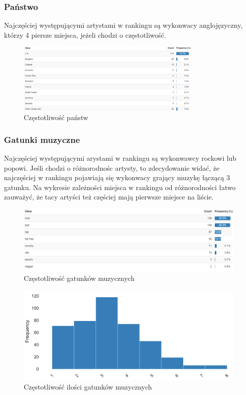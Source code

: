 \documentclass[12pt, letterpaper]{article}
\begin{document}
\subsubsection{Państwo}

Najczęściej występującymi artystami w rankingu są wykonwacy anglojęzyczny, którzy 4 piersze miejsca, jeżeli chodzi o częstotliwość.

\begin{figure}[h]
    \centering
    \includegraphics[width=0.8\textwidth]{country_frequency}  
    \caption{Częstotliwość państw}
\end{figure}

\subsubsection{Gatunki muzyczne}

Najczęściej występującymi arystami w rankingu są wykonwawcy rockowi lub popowi. Jeśli chodzi o różnorodnośc artysty, to zdecydowanie widać, że najczęściej w rankingu pojawiają się wykonwacy grający muzykę łączącą 3 gatunku. Na wykresie zależności miejsca w rankingu od różnorodności łatwo zauważyć, że tacy artyści też częściej mają pierwsze miejsce na liście.

\begin{figure}[h]
    \centering
    \includegraphics[width=1\textwidth]{genres_frequency}  
    \caption{Częstotliwość gatunków muzycznych}
\end{figure}

\begin{figure}[h]
    \centering
    \includegraphics[width=1\textwidth]{number_of_genres_frequency}  
    \caption{Częstotliwość ilości gatunków muzycznych}
\end{figure}
\end{document}
